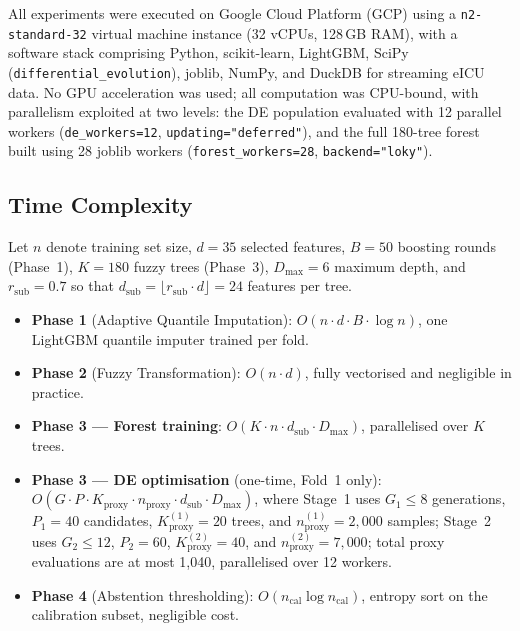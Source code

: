 \documentclass[journal]{IEEEtran}
\begin{document}
	All experiments were executed on Google Cloud Platform (GCP) using a \texttt{n2-standard-32} virtual machine instance (32 vCPUs, 128\,GB RAM), with a software stack comprising Python, scikit-learn, LightGBM, SciPy (\texttt{differential\_evolution}), joblib, NumPy, and DuckDB for streaming eICU data. No GPU acceleration was used; all computation was CPU-bound, with parallelism exploited at two levels: the DE population evaluated with 12 parallel workers (\texttt{de\_workers=12}, \texttt{updating="deferred"}), and the full 180-tree forest built using 28 joblib workers (\texttt{forest\_workers=28}, \texttt{backend="loky"}).
	
	\subsection{Time Complexity}
	
	Let $n$ denote training set size, $d=35$ selected features, $B=50$ boosting rounds (Phase~1), $K=180$ fuzzy trees (Phase~3), $D_{\max}=6$ maximum depth, and $r_{\text{sub}}=0.7$ so that $d_{\text{sub}} = \lfloor r_{\text{sub}} \cdot d \rfloor = 24$ features per tree.
	
	\begin{itemize}
		\item \textbf{Phase 1} (Adaptive Quantile Imputation):
		$O(n \cdot d \cdot B \cdot \log n)$, one LightGBM quantile imputer
		trained per fold.
		\item \textbf{Phase 2} (Fuzzy Transformation): $O(n \cdot d)$, fully
		vectorised and negligible in practice.
		\item \textbf{Phase 3 --- Forest training}:
		$O(K \cdot n \cdot d_{\text{sub}} \cdot D_{\max})$, parallelised over
		$K$ trees.
		\item \textbf{Phase 3 --- DE optimisation} (one-time, Fold~1 only):
		$O(G \cdot P \cdot K_{\text{proxy}} \cdot n_{\text{proxy}} \cdot
		d_{\text{sub}} \cdot D_{\max})$, where Stage~1 uses $G_1 \le 8$
		generations, $P_1=40$ candidates, $K_{\text{proxy}}^{(1)}=20$ trees,
		and $n_{\text{proxy}}^{(1)}=2{,}000$ samples; Stage~2 uses $G_2 \le
		12$, $P_2=60$, $K_{\text{proxy}}^{(2)}=40$, and
		$n_{\text{proxy}}^{(2)}=7{,}000$; total proxy evaluations are at most
		1{,}040, parallelised over 12 workers.
		\item \textbf{Phase 4} (Abstention thresholding):
		$O(n_{\text{cal}} \log n_{\text{cal}})$, entropy sort on the
		calibration subset, negligible cost.
	\end{itemize}
	
\end{document}
